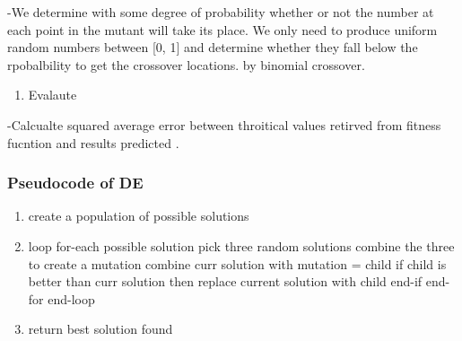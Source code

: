 \documentclass[
]{article}
\providecommand{\tightlist}{%
  \setlength{\itemsep}{0pt}\setlength{\parskip}{0pt}}
\begin{document}
-We determine with some degree of probability whether or not the number
at each point in the mutant will take its place. We only need to produce
uniform random numbers between {[}0, 1{]} and determine whether they
fall below the rpobalbility to get the crossover locations. by binomial
crossover.

\begin{enumerate}
\def\labelenumi{\Roman{enumi})}
\setcounter{enumi}{2}
\tightlist
\item
  Evalaute
\end{enumerate}

-Calcualte squared average error between throitical values retirved from
fitness fucntion and results predicted .

\hypertarget{pseudocode-of-de}{%
\subsubsection{Pseudocode of DE}\label{pseudocode-of-de}}

\begin{enumerate}
\def\labelenumi{\Roman{enumi})}
\tightlist
\item
  create a population of possible solutions
\item
  loop for-each possible solution pick three random solutions combine
  the three to create a mutation combine curr solution with mutation =
  child if child is better than curr solution then replace current
  solution with child end-if end-for end-loop
\item
  return best solution found
\end{enumerate}
\end{document}

